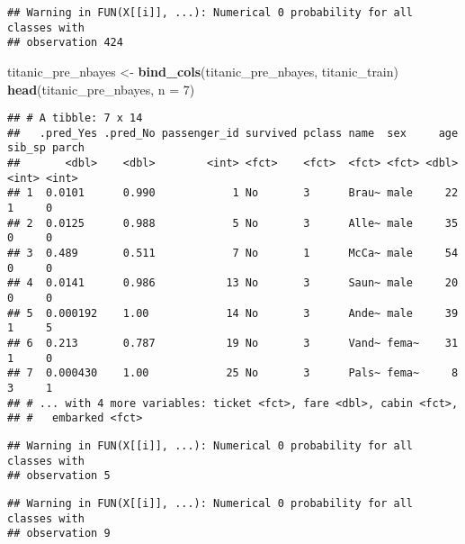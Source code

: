 \documentclass[]{article}
\newenvironment{Shaded}{\begin{snugshade}}{\end{snugshade}}
\newcommand{\DataTypeTok}[1]{\textcolor[rgb]{0.13,0.29,0.53}{#1}}
\newcommand{\DecValTok}[1]{\textcolor[rgb]{0.00,0.00,0.81}{#1}}
\newcommand{\KeywordTok}[1]{\textcolor[rgb]{0.13,0.29,0.53}{\textbf{#1}}}
\newcommand{\NormalTok}[1]{#1}
\newcommand{\OperatorTok}[1]{\textcolor[rgb]{0.81,0.36,0.00}{\textbf{#1}}}
\newcommand{\StringTok}[1]{\textcolor[rgb]{0.31,0.60,0.02}{#1}}
\begin{document}
\begin{verbatim}
## Warning in FUN(X[[i]], ...): Numerical 0 probability for all classes with
## observation 424
\end{verbatim}

\begin{Shaded}
\begin{Highlighting}[]
\NormalTok{titanic_pre_nbayes <-}\StringTok{ }\KeywordTok{bind_cols}\NormalTok{(titanic_pre_nbayes, titanic_train)}
\KeywordTok{head}\NormalTok{(titanic_pre_nbayes, }\DataTypeTok{n =} \DecValTok{7}\NormalTok{)}
\end{Highlighting}
\end{Shaded}

\begin{verbatim}
## # A tibble: 7 x 14
##   .pred_Yes .pred_No passenger_id survived pclass name  sex     age sib_sp parch
##       <dbl>    <dbl>        <int> <fct>    <fct>  <fct> <fct> <dbl>  <int> <int>
## 1  0.0101      0.990            1 No       3      Brau~ male     22      1     0
## 2  0.0125      0.988            5 No       3      Alle~ male     35      0     0
## 3  0.489       0.511            7 No       1      McCa~ male     54      0     0
## 4  0.0141      0.986           13 No       3      Saun~ male     20      0     0
## 5  0.000192    1.00            14 No       3      Ande~ male     39      1     5
## 6  0.213       0.787           19 No       3      Vand~ fema~    31      1     0
## 7  0.000430    1.00            25 No       3      Pals~ fema~     8      3     1
## # ... with 4 more variables: ticket <fct>, fare <dbl>, cabin <fct>,
## #   embarked <fct>
\end{verbatim}

\begin{Shaded}
\end{Shaded}

\begin{verbatim}
## Warning in FUN(X[[i]], ...): Numerical 0 probability for all classes with
## observation 5
\end{verbatim}

\begin{verbatim}
## Warning in FUN(X[[i]], ...): Numerical 0 probability for all classes with
## observation 9
\end{verbatim}
\end{document}
